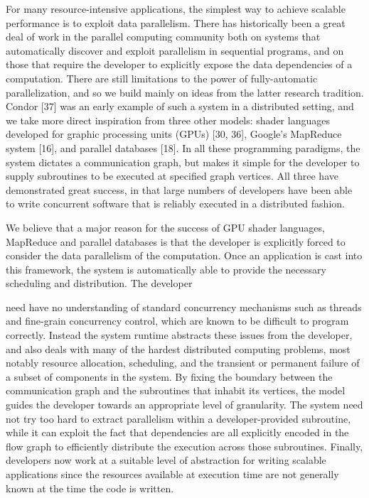 \documentclass[
]{article}
\begin{document}
For many resource-intensive applications, the simplest way to achieve
scalable performance is to exploit data parallelism. There has
historically been a great deal of work in the parallel computing
community both on systems that automatically discover and exploit
parallelism in sequential programs, and on those that require the
developer to explicitly expose the data dependencies of a computation.
There are still limitations to the power of fully-automatic
parallelization, and so we build mainly on ideas from the latter
research tradition. Condor {[}37{]} was an early example of such a
system in a distributed setting, and we take more direct inspiration
from three other models: shader languages developed for graphic
processing units (GPUs) {[}30, 36{]}, Google's MapReduce system
{[}16{]}, and parallel databases {[}18{]}. In all these programming
paradigms, the system dictates a communication graph, but makes it
simple for the developer to supply subroutines to be executed at
specified graph vertices. All three have demonstrated great success, in
that large numbers of developers have been able to write concurrent
software that is reliably executed in a distributed fashion.

We believe that a major reason for the success of GPU shader languages,
MapReduce and parallel databases is that the developer is explicitly
forced to consider the data parallelism of the computation. Once an
application is cast into this framework, the system is automatically
able to provide the necessary scheduling and distribution. The developer

need have no understanding of standard concurrency mechanisms such as
threads and fine-grain concurrency control, which are known to be
difficult to program correctly. Instead the system runtime abstracts
these issues from the developer, and also deals with many of the hardest
distributed computing problems, most notably resource allocation,
scheduling, and the transient or permanent failure of a subset of
components in the system. By fixing the boundary between the
communication graph and the subroutines that inhabit its vertices, the
model guides the developer towards an appropriate level of granularity.
The system need not try too hard to extract parallelism within a
developer-provided subroutine, while it can exploit the fact that
dependencies are all explicitly encoded in the flow graph to efficiently
distribute the execution across those subroutines. Finally, developers
now work at a suitable level of abstraction for writing scalable
applications since the resources available at execution time are not
generally known at the time the code is written.
\end{document}

